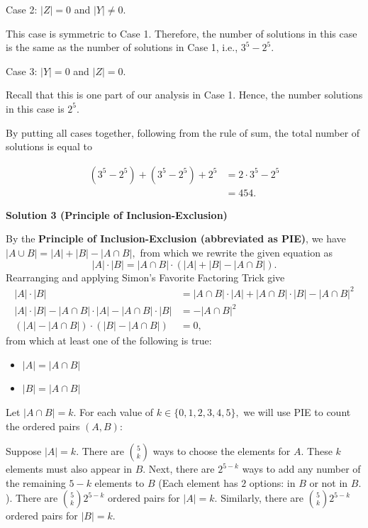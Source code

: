 \begin{enumerate}
 Case 2: $|Z| = 0$ and $|Y| \neq 0$. 

 This case is symmetric to Case 1. Therefore, the number of solutions in this case is the same as the number of solutions in Case 1, i.e., $3^5 - 2^5$.

 Case 3: $|Y| = 0$ and $|Z| = 0$.

 Recall that this is one part of our analysis in Case 1. Hence, the number solutions in this case is $2^5$.

 By putting all cases together, following from the rule of sum, the total number of solutions is equal to

 
 \begin{align*} \left( 3^5 - 2^5 \right) + \left( 3^5 - 2^5 \right) + 2^5 & = 2 \cdot 3^5 - 2^5 \\ & = \boxed{454} . \end{align*}





\textbf{Solution 3 (Principle of Inclusion-Exclusion)}

By the \textbf{Principle of Inclusion-Exclusion (abbreviated as PIE)}, we have $|A \cup B|=|A|+|B|-|A \cap B|,$ from which we rewrite the given equation as 
 \[|A| \cdot |B| = |A \cap B| \cdot \left(|A|+|B|-|A \cap B|\right).\]Rearranging and applying Simon's Favorite Factoring Trick give
 \begin{align*} |A| \cdot |B| &= |A \cap B|\cdot|A| + |A \cap B|\cdot|B| - |A \cap B|^2 \\ |A| \cdot |B| - |A \cap B|\cdot|A| - |A \cap B|\cdot|B| &= - |A \cap B|^2 \\ \left(|A| - |A \cap B|\right)\cdot\left(|B| - |A \cap B|\right) &=0, \end{align*}
from which at least one of the following is true: 

 
            \begin{itemize}
        \item $|A|=|A \cap B|$
            \end{itemize}
            
            \begin{itemize}
        \item $|B|=|A \cap B|$
            \end{itemize}
            Let $|A \cap B|=k.$ For each value of $k\in\{0,1,2,3,4,5\},$ we will use PIE to count the ordered pairs $(A,B):$

 Suppose $|A|=k.$ There are $\binom{5}{k}$ ways to choose the elements for $A.$ These $k$ elements must also appear in $B.$ Next, there are $2^{5-k}$ ways to add any number of the remaining $5-k$ elements to $B$ (Each element has $2$ options: in $B$ or not in $B.$). There are $\binom{5}{k}2^{5-k}$ ordered pairs for $|A|=k.$ Similarly, there are $\binom{5}{k}2^{5-k}$ ordered pairs for $|B|=k.$ 


\end{enumerate}
